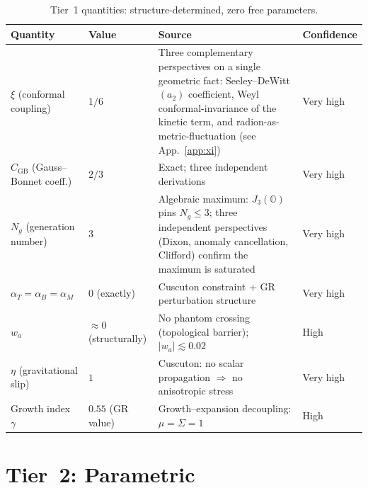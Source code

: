 \begin{table}[h!]
\caption{Tier~1 quantities: structure-determined, zero free parameters.}
\label{tab:val-tier1}
\small
\renewcommand{\arraystretch}{1.25}
\begin{tabular}{@{}p{3.5cm}p{3.0cm}p{5.5cm}p{2.5cm}@{}}
\toprule
\textbf{Quantity} & \textbf{Value} & \textbf{Source} & \textbf{Confidence} \\
\midrule

$\xi$ (conformal coupling) &
$1/6$ &
Three complementary perspectives on a single geometric fact: Seeley--DeWitt $(a_2)$ coefficient, Weyl conformal-invariance of the kinetic term, and radion-as-metric-fluctuation (see App.~\ref{app:xi}) &
Very high \\

$C_\mathrm{GB}$ (Gauss--Bonnet coeff.) &
$2/3$ &
Exact; three independent derivations &
Very high \\

$N_g$ (generation number) &
$3$ &
Algebraic maximum: $J_3(\mathbb{O})$ pins $N_g \leq 3$; three independent perspectives (Dixon, anomaly cancellation, Clifford) confirm the maximum is saturated &
Very high \\

$\alpha_T = \alpha_B = \alpha_M$ &
$0$ (exactly) &
Cuscuton constraint + GR perturbation structure &
Very high \\

$w_a$ &
$\approx 0$ (structurally) &
No phantom crossing (topological barrier); $|w_a| \lesssim 0.02$ &
High \\

$\eta$ (gravitational slip) &
$1$ &
Cuscuton: no scalar propagation $\Rightarrow$ no anisotropic stress &
Very high \\

Growth index $\gamma$ &
$0.55$ (GR value) &
Growth--expansion decoupling: $\mu = \Sigma = 1$ &
High \\

\bottomrule
\end{tabular}
\end{table}

\section{Tier~2: Parametric}
\label{app:val-tier2}

